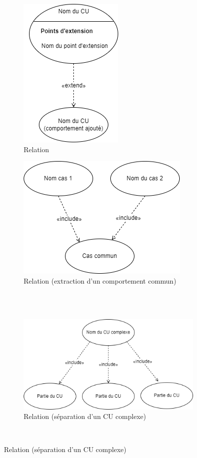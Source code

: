 \begin{figure}[H]
	\caption{Mise en œuvre des relations  et }
	\centering
	\begin{subfigure}[b]{0.45\textwidth}
		\centering
		\includegraphics[scale=0.6]{relation extend.png}
		\caption*{Relation }
	\end{subfigure} \hfill
	\begin{subfigure}[b]{0.45\textwidth}
		\centering
		\includegraphics[scale=0.6]{relation include 2.png}
		\caption*{Relation  (extraction d'un comportement commun)}
	\end{subfigure} \\
	~
	\hfill
	\begin{subfigure}[b]{0.6\textwidth}
		\centering
		\includegraphics[scale=0.6]{relation include 1.png}
		\caption*{Relation  (séparation d'un \acrshort{CU} complexe)}
	\end{subfigure}
	\hfill
	~
\end{figure}

